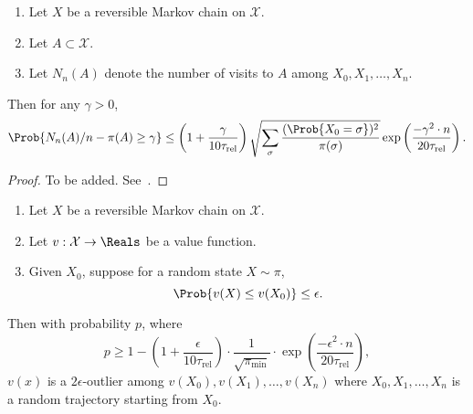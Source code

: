 \documentclass[12pt]{article}
\begin{document}
\begin{theorem}
    \label{thm:serialsignificance:gillman}
    \begin{enumerate}
        \item
            Let \( X \) be a reversible Markov chain
            on \( \mathcal{X} \).
        \item
            Let \( A \subset \mathcal{X} \).
        \item
            Let \( N_n(A) \) denote the number of visits to \( A \)
            among \( X_0, X_1, \dots, X_n \).
    \end{enumerate}
    Then for any \( \gamma > 0 \),
    \[
        \Prob{N_n(A)/n - \pi(A) \ge \gamma} \le \left( 1 + \frac{\gamma}
        {10 \tau_{\text{rel}}} \right) \sqrt{\sum_{\sigma} \frac{(\Prob{X_0
        = \sigma})^2}{\pi (\sigma)}} \exp \left( \frac{-\gamma^2 \cdot n}
        {20 \tau_{\text{rel}}} \right).
    \]
\end{theorem}

\begin{proof}
  To be added.  See~\cite{gillman98}.
\end{proof}

\begin{theorem}
    \label{thm:serialsignificance:powerthm}
    \begin{enumerate}
        \item
            Let \( X \) be a reversible Markov chain on \( \mathcal{X} \).
        \item
            Let \( v :  \mathcal{X} \to \Reals \) be a value function.
        \item\label{enum:serialsignificance:powerthm2}
            Given \( X_0 \), suppose for a random state \( X
            \sim \pi \),
            \[
                \Prob{v(X) \le v(X_0)} \le \epsilon.
            \]
    \end{enumerate}
    Then with probability \( p \), where
    \[
        p \ge 1 - \left( 1 + \frac{\epsilon}{10 \tau_{\text{rel}}}
        \right) \cdot \frac{1}{\sqrt{\pi_{\min}}} \cdot \exp \left(
        \frac {-\epsilon^ {2} \cdot n}{20 \tau_{\text{rel}}} \right),
    \] \( v(x) \) is a \( 2\epsilon \)-outlier among \( v(X_0),
    v(X_1), \dots, v(X_n) \) where \( X_0, X_1,
    \dots, X_n \) is a random trajectory starting from \( X_0 \).
\end{theorem}
\end{document}
